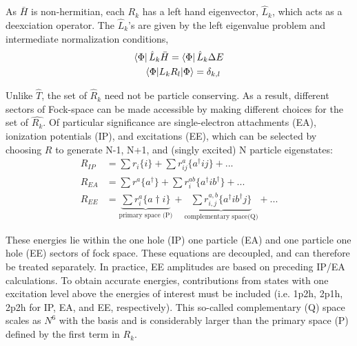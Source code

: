 As $\bar{H}$ is non-hermitian, each $R_{k}$ has a left hand eigenvector, $\hat{L}_{k}$, which acts as a deexciation operator. The $\hat{L}_{k}$'s are given by the left eigenvalue problem and intermediate normalization conditions,
\begin{align}
\bra{\Phi} \hat{L}_k \bar{H} = \bra{\Phi}\hat{L}_k \Delta E\\
\braket{\Phi| L_k R_l |\Phi} = \delta_{k,l}\
\end{align}

Unlike $\hat{T}$, the set of $\hat{R}_k$ need not be particle conserving. As a result, different sectors of Fock-space can be made accessible by making different choices for the set of $\hat{R_k}$. Of particular significance are single-electron attachments (EA), ionization potentials (IP), and excitations (EE), which can be selected by choosing $R$ to generate N-1, N+1, and (singly excited) N particle eigenstates: 
\begin{align}
R_{IP} &= \sum r_i \{i\} + \sum r_{ij}^a  \{a^\dag i j\} + ...  \label{eq:RIP}\\ 
R_{EA} &= \sum r^a \{a^\dag \} + \sum r^{ab}_{i} \{a^\dag i b^\dag\} + ... \label{eq:REA}\\
R_{EE} &= \underbrace{\sum r^a_i \{a\dag i\}}_{\text{primary space (P)}} + \underbrace{\sum r^{a,b}_{i,j}  \{a^\dag i b^\dag j\}}_{\text{complementary space(Q)}} + ... \label{eq:REE}
\end{align}

These energies lie within the one hole (IP) one particle (EA) and one particle one hole (EE) sectors of fock space. These equations are decoupled, and can therefore be treated separately. In practice, EE amplitudes are based on preceding IP/EA calculations. To obtain accurate energies, contributions from states with one excitation level above the energies of interest must be included (i.e. 1p2h, 2p1h, 2p2h for IP, EA, and EE, respectively). This so-called complementary (Q) space scales as $N^6$ with the basis and is considerably larger than the primary space (P) defined by the first term in $R_k$. 

